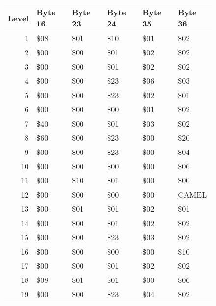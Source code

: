 \begin{figure}[H]
  {
  \setlength{\tabcolsep}{3.0pt}
  \setlength\cmidrulewidth{\heavyrulewidth} %
  \begin{adjustbox}{width=\textwidth}

\begin{tabular}{rlllll}
\toprule
   Level & Byte 16   & Byte 23   & Byte 24   & Byte 35   & Byte 36   \\
\midrule
       1 & \$08       & \$01       & \$10       & \$01       & \$02       \\
       2 & \$00       & \$00       & \$01       & \$02       & \$02       \\
       3 & \$00       & \$00       & \$01       & \$02       & \$02       \\
       4 & \$00       & \$00       & \$23       & \$06       & \$03       \\
       5 & \$00       & \$00       & \$23       & \$02       & \$01       \\
       6 & \$00       & \$00       & \$00       & \$01       & \$02       \\
       7 & \$40       & \$00       & \$01       & \$03       & \$02       \\
       8 & \$60       & \$00       & \$23       & \$00       & \$20       \\
       9 & \$00       & \$00       & \$23       & \$00       & \$04       \\
      10 & \$00       & \$00       & \$00       & \$00       & \$06       \\
      11 & \$00       & \$10       & \$01       & \$00       & \$00       \\
      12 & \$00       & \$00       & \$00       & \$00       & CAMEL     \\
      13 & \$00       & \$01       & \$01       & \$02       & \$01       \\
      14 & \$00       & \$00       & \$01       & \$02       & \$02       \\
      15 & \$00       & \$00       & \$23       & \$03       & \$02       \\
      16 & \$00       & \$00       & \$00       & \$00       & \$10       \\
      17 & \$00       & \$00       & \$01       & \$02       & \$02       \\
      18 & \$08       & \$01       & \$01       & \$00       & \$06       \\
      19 & \$00       & \$00       & \$23       & \$04       & \$02       \\

\end{tabular}
\end{adjustbox}}
\end{figure}
